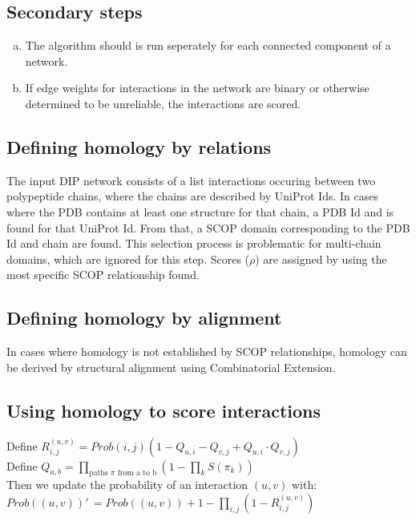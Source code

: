 \documentclass[12pt,twoside]{article}
\def\NI{\noindent}
\def\RS{
	\setlength{\itemsep}{0em}
	\setlength{\parskip}{0.4em}
	\setlength{\parsep}{0em}
}
\begin{document}
\subsection{Secondary steps}
\begin{enumerate}[a)]
\item The algorithm should is run seperately for each connected component of a network.
\item If edge weights for interactions in the network are binary or otherwise determined to be unreliable, the interactions are scored.
\end{enumerate}

\subsection*{Defining homology by relations}
\NI The input DIP network consists of a list interactions occuring between two polypeptide chains, where the chains are described by UniProt Ids. In cases where the PDB contains at least one structure for that chain, a PDB Id and is found for that UniProt Id. From that, a SCOP domain corresponding to the PDB Id and chain are found. This selection process is problematic for multi-chain domains, which are ignored for this step. Scores ($\rho$) are assigned by using the most specific SCOP relationship found.\RS

\subsection{Defining homology by alignment}

In cases where homology is not established by SCOP relationships, homology can be derived by structural alignment using Combinatorial Extension.

\subsection{Using homology to score interactions}

Define
$R_{i,j}^{(u,v)} = Prob(i,j) \left(1 - \displaystyle Q_{u,i} - Q_{v,j} + Q_{u,i} \cdot Q_{v,j} \right)$\\
Define $Q_{a,b} = \displaystyle \prod_{\text{paths } \pi \text{ from a to b}} \left( 1 - \prod_{k} S(\pi_k) \right)$\\
Then we update the probability of an interaction $(u,v)$ with:\\
$Prob((u,v))'\,\! = Prob((u,v)) + 1 - \displaystyle \prod_{i,j}(1 - R_{i,j}^{(u,v)})$
\end{document}
